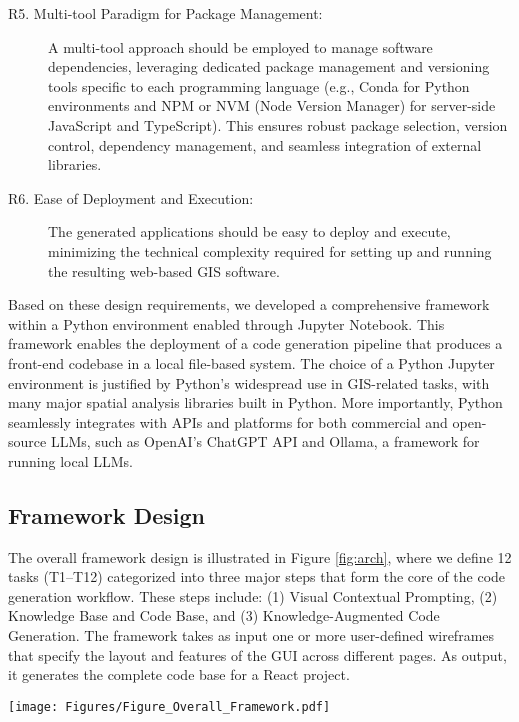 \begin{description}
    \item[R5. Multi-tool Paradigm for Package Management:]  
    A multi-tool approach should be employed to manage software dependencies, leveraging dedicated package management and versioning tools specific to each programming language (e.g., Conda for Python environments and NPM or NVM (Node Version Manager) for server-side JavaScript and TypeScript). This ensures robust package selection, version control, dependency management, and seamless integration of external libraries.
    
    \item[R6. Ease of Deployment and Execution:]  
    The generated applications should be easy to deploy and execute, minimizing the technical complexity required for setting up and running the resulting web-based GIS software. 
\end{description}
Based on these design requirements, we developed a comprehensive framework within a Python environment enabled through Jupyter Notebook. This framework enables the deployment of a code generation pipeline that produces a front-end codebase in a local file-based system. The choice of a Python Jupyter environment is justified by Python’s widespread use in GIS-related tasks, with many major spatial analysis libraries built in Python. More importantly, Python seamlessly integrates with APIs and platforms for both commercial and open-source LLMs, such as OpenAI's ChatGPT API and Ollama, a framework for running local LLMs.

\subsection{Framework Design}
\label{subsec:frameworkDesign}
The overall framework design is illustrated in Figure \ref{fig:arch}, where we define 12 tasks (T1–T12) categorized into three major steps that form the core of the code generation workflow. These steps include: (1) Visual Contextual Prompting, (2) Knowledge Base and Code Base, and (3) Knowledge-Augmented Code Generation. The framework takes as input one or more user-defined wireframes that specify the layout and features of the GUI across different pages. As output, it generates the complete code base for a React project.

\begin{figure*}[htbp]
 \centering
\texttt{[image: Figures/Figure\_Overall\_Framework.pdf]}
\caption{Overall framework architecture for LLM-driven code generation using knowledge-augmented prompting and structured domain knowledge.}
 \label{fig:arch}
\end{figure*}


